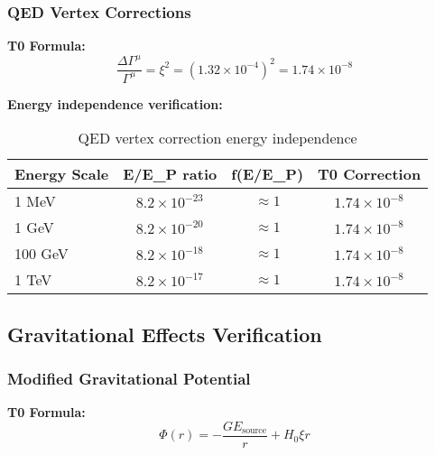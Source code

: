 \documentclass[12pt,a4paper]{article}
\begin{document}
	\subsubsection{QED Vertex Corrections}
	
	\textbf{T0 Formula:}
	\begin{equation}
		\frac{\Delta\Gamma^{\mu}}{\Gamma^{\mu}} = \xi^2 = (1.32 \times 10^{-4})^2 = 1.74 \times 10^{-8}
		\label{eq:qed_vertex_verification}
	\end{equation}
	
	\textbf{Energy independence verification:}
	\begin{table}[htbp]
		\centering
		\caption{QED vertex correction energy independence}
		\label{tab:qed_vertex_verification}
		\begin{tabular}{lccc}
			\toprule
			\textbf{Energy Scale} & \textbf{E/E\_P ratio} & \textbf{f(E/E\_P)} & \textbf{T0 Correction} \\
			\midrule
			1 MeV & $8.2 \times 10^{-23}$ & $\approx 1$ & $1.74 \times 10^{-8}$ \\
			1 GeV & $8.2 \times 10^{-20}$ & $\approx 1$ & $1.74 \times 10^{-8}$ \\
			100 GeV & $8.2 \times 10^{-18}$ & $\approx 1$ & $1.74 \times 10^{-8}$ \\
			1 TeV & $8.2 \times 10^{-17}$ & $\approx 1$ & $1.74 \times 10^{-8}$ \\
			\bottomrule
		\end{tabular}
	\end{table}
	
	\subsection{Gravitational Effects Verification}
	\label{subsec:gravity_verification}
	
	\subsubsection{Modified Gravitational Potential}
	
	\textbf{T0 Formula:}
	\begin{equation}
		\Phi(r) = -\frac{GE_{\text{source}}}{r} + H_0 \xi r
		\label{eq:gravity_potential_verification}
	\end{equation}
	
\end{document}
